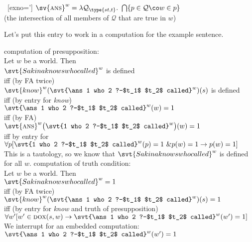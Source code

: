 \ex~[exno=\lastx']%
$\sv{\ans}^{w}= \lambda \mathcal{Q}_{\type{st,t}}.\ \bigcap\{p\in \mathcal{Q}\co w\in p\}$\\
\hfill (the intersection of all members of $\mathcal{Q}$ that are true in $w$)
\xe

Let's put this entry to work in a computation for the example sentence.

\pex\label{ex:knows-who-comp}%
\a computation of presupposition:\\
Let $w$ be a world. Then \\
$\svt{Sakina knows who called}^{w}$ is defined\\
%
{\small iff (by FA twice)}\\
$\svt{know}^{w}(\svt{\ans 1 who 2 ?-$t_1$ $t_2$ called}^{w})(s)$ is defined\\
{\small iff (by entry for \emph{know})}\\
$\svt{\ans 1 who 2 ?-$t_1$ $t_2$ called}^{w}(w)=1$\\
{\small iff (by FA)}\\
$\svt{\ans}^{w}\big(\svt{1 who 2 ?-$t_1$ $t_2$ called}^{w}\bigr)(w)=1$\\
{\small iff by entry for \ans}\\
$\forall p [ \svt{1 who 2 ?-$t_1$ $t_2$ called}^{w}(p)=1\ \& p(w)=1 \rightarrow p(w)=1 ]$\\
This is a tautology, so we know that $\svt{Sakina knows who called}^{w}$ is
defined for all $w$.
\a computation of truth condition:\\
Let $w$ be a world. Then\\
$\svt{Sakina knows who called}^{w} = 1$\\
{\small iff (by FA twice)}\\
$\svt{know}^{w}(\svt{\ans 1 who 2 ?-$t_1$ $t_2$ called}^{w})(s) = 1$\\
{\small iff (by entry for \emph{know} and truth of presupposition)}\\
$\forall w' [w'\in \dox(s,w) \rightarrow \svt{\ans 1 who 2 ?-$t_1$ $t_2$ called}^{w}(w')=1]$
\a We interrupt for an embedded computation:\\
$\svt{\ans 1 who 2 ?-$t_1$ $t_2$ called}^{w}(w')=1$\\
